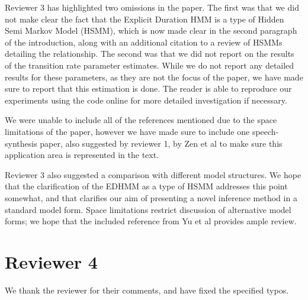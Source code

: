 \documentclass{article}
\begin{document}
Reviewer 3 has highlighted two omissions in the paper. The first was that we did not make clear the fact that the Explicit Duration HMM is a type of Hidden Semi Markov Model (HSMM), which is now made clear in the second paragraph of the introduction, along with an additional citation to a review of HSMMs detailing the relationship. The second was that we did not report on the results of the transition rate parameter estimates. While we do not report any detailed results for these parameters, as they are not the focus of the paper, we have made sure to report that this estimation is done. The reader is able to reproduce our experiments using the code online for more detailed investigation if necessary. 

We were unable to include all of the references mentioned due to the space limitations of the paper, however we have made sure to include one speech-synthesis paper, also suggested by reviewer 1, by Zen et al to make sure this application area is represented in the text. 

Reviewer 3 also suggested a comparison with different model structures. We hope that the clarification of the EDHMM as a type of HSMM addresses this point somewhat, and that clarifies our aim of presenting a novel inference method in a standard model form. Space limitations restrict discussion of alternative model forms; we hope that the included reference from Yu et al provides ample review.

\section*{Reviewer 4}

We thank the reviewer for their comments, and have fixed the specified typos. 
\end{document}

